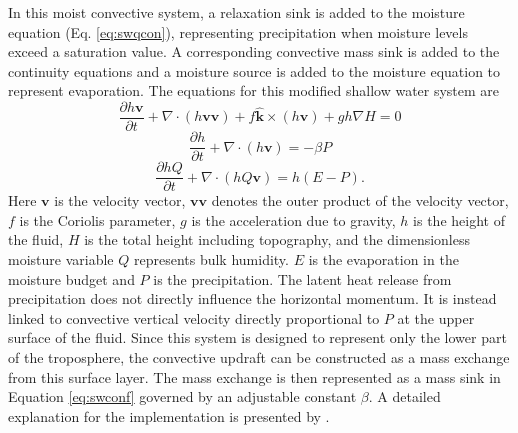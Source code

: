      In this moist convective system, a relaxation sink is added to the moisture equation (Eq. \ref{eq:swqcon}), 
     representing precipitation when moisture levels exceed a saturation value. 
     A corresponding convective mass sink is added to the continuity equations and a 
     moisture source is added to the moisture equation to represent evaporation. 
     The equations for this modified shallow water system are
   \begin{equation}
     \label{eq:swmomf} \frac{\partial h \mathbf{v}}{\partial t} +
     \nabla \cdot ( h \mathbf{v} \mathbf{v}) + f \mathbf{\hat{k}}\times(h\mathbf{v}) + gh\nabla H = 0
   \end{equation}
   \begin{equation}
     \label{eq:swconf}  \frac{\partial h}{\partial t} + \nabla \cdot (h\mathbf{v}) = - \beta P 
   \end{equation}
   \begin{equation}
     \label{eq:swqcon}  \frac{\partial hQ}{\partial t} + \nabla \cdot (hQ\mathbf{v}) = h(E - P).
   \end{equation}
   Here $\mathbf{v}$ is the velocity vector, $\mathbf{v}\mathbf{v}$ denotes the outer product
   of the velocity vector, $f$ is the Coriolis parameter, $g$ is 
   the acceleration due to gravity,
   $h$ is the height of the fluid, $H$ is the total height including topography, and the
   dimensionless moisture variable $Q$ represents bulk humidity. 
   $E$ is the evaporation in the moisture budget and $P$ is the precipitation. 
   The latent heat release from precipitation does not directly influence the 
   horizontal momentum. It is instead linked to convective vertical velocity 
   directly proportional to $P$ at the upper surface of the fluid.
   Since this system is designed to represent only the lower part of the 
   troposphere, the convective updraft can be constructed as a mass exchange 
   from this surface layer. The mass exchange is then represented as a mass 
   sink in Equation \ref{eq:swconf} governed by an adjustable
   constant $\beta$.  A detailed explanation for the implementation is 
   presented by \cite{bouchut2009fronts}.

